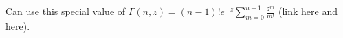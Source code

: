 \documentclass[12pt]{article}
\newcommand{\ptjtk}{\rho(\vec{t}_j\cdot\vec{t}_k)}
\newcommand{\tjtk}{(\vec{t}_j\cdot\vec{t}_k)}
\begin{document}
   
Can use this special value of $\Gamma(n,z) = (n-1)!e^{-z}\sum^{n-1}_{m=0} \frac{z^m}{m!}$ (link \href{http://functions.wolfram.com/GammaBetaErf/Gamma2/03/01/02/0007/}{here} and \href{https://en.wikipedia.org/wiki/Incomplete_gamma_function#Special_values}{here}).


\begin{comment}
   \begin{align}
   &= e^{\frac{1}{2}\rho^2\tjtk^2} \frac{(\frac{N}{2}-1)!e^{-(\ptjtk)^2/2}\sum^{N/2-1}_{n=0} \Big(\frac{(\ptjtk)^2}{2}\Big)^{n}\frac{1}{n!} } 
   {(\frac{N}{2}-1)!e^{-(\rho)^2/2}\sum^{N/2-1}_{n=0} \Big(\frac{\rho^2}{2}\Big)^{n}\frac{1}{n!} } \\
   &= \lim_{N\rightarrow\infty} e^{\frac{1}{2}\rho^2\tjtk^2} e^{\frac{1}{2}\rho^2(1-\tjtk^2)}
   \frac{\sum^{N/2-1}_{n=0} \Big(\frac{(\ptjtk)^2}{2}\Big)^{n}\frac{1}{n!} } 
   {\sum^{N/2-1}_{n=0} \Big(\frac{\rho^2}{2}\Big)^{n}\frac{1}{n!} } \\
   &= e^{\frac{1}{2}\rho^2} \frac{e^{\frac{1}{2}(\ptjtk)^2}}{e^{\frac{1}{2}\rho^2}} \\
   & = e^{\frac{1}{2}(\ptjtk)^2} 
   \end{align}
\end{comment}

\end{document}
